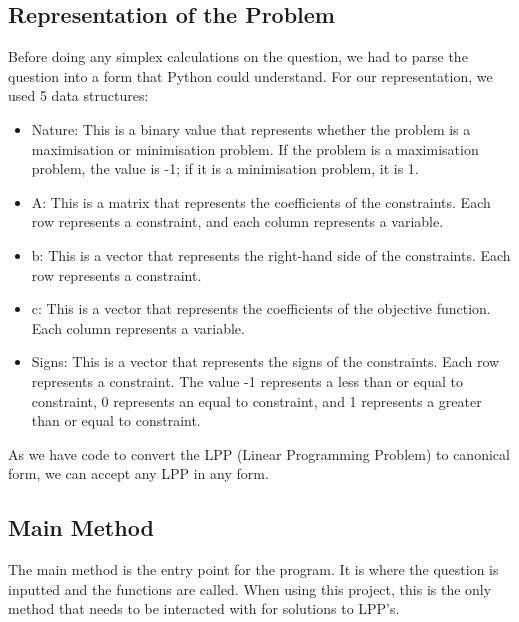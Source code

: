 \documentclass{article}
\numberwithin{equation}{section}
\begin{document}
\subsection{Representation of the Problem}
Before doing any simplex calculations on the question, we had to parse the question into a form that Python could understand. For our representation, we used 5 data structures:
\begin{itemize}
    \item Nature: This is a binary value that represents whether the problem is a maximisation or minimisation problem. If the problem is a maximisation problem, the value is -1; if it is a minimisation problem, it is 1.
    \item A: This is a matrix that represents the coefficients of the constraints. Each row represents a constraint, and each column represents a variable.
    \item b: This is a vector that represents the right-hand side of the constraints. Each row represents a constraint.
    \item c: This is a vector that represents the coefficients of the objective function. Each column represents a variable.
    \item Signs: This is a vector that represents the signs of the constraints. Each row represents a constraint. The value -1 represents a less than or equal to constraint, 0 represents an equal to constraint, and 1 represents a greater than or equal to constraint.
\end{itemize}
As we have code to convert the LPP (Linear Programming Problem) to canonical form, we can accept any LPP in any form.
\subsection{Main Method}
The main method is the entry point for the program. It is where the question is inputted and the functions are called. When using this project, this is the only method that needs to be interacted with for solutions to LPP's.
\end{document}
